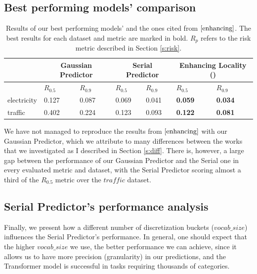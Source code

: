\documentclass[en]{pracamgr}
\begin{document}
	\subsection*{Best performing models' comparison}
	
	\begin{table}[h]
		\begin{center}
			\begin{tabular}
				{ |p{2cm}|p{1.5cm}|p{1.5cm}||p{1.5cm}|p{1.5cm}||p{1.5cm}|p{1.5cm}|  }
				\hline
				& \multicolumn{2}{c||}{Gaussian Predictor} & \multicolumn{2}{|c||}{Serial Predictor} & \multicolumn{2}{|c|}{Enhancing Locality (\cite{enhancing})} \\
				\hline
				& \hfil $R_{0.5}$ & \hfil $R_{0.9}$ & \hfil $R_{0.5}$ & \hfil $R_{0.9}$
				& \hfil $R_{0.5}$ & \hfil $R_{0.9}$
				\\
				\hline
				electricity & \hfil 0.127   & \hfil 0.087    & \hfil 0.069 &   \hfil 0.041 & \hfil \textbf{0.059} & \hfil \textbf{0.034} 
				\\
				traffic &  \hfil 0.402   & \hfil 0.224   & \hfil 0.123 &   \hfil 0.093 & \hfil \textbf{0.122} & \hfil \textbf{0.081}\\
				\hline
			\end{tabular}
			\caption{\label{tab:results}Results of our best performing models' and the ones cited from $\cite{enhancing}$. The best results for each dataset and metric are marked in bold. $R_{p}$ refers to the risk metric described in Section \ref{s:risk}.}
		\end{center}
	\end{table}
	
	We have not managed to reproduce the results from $\cite{enhancing}$ with our Gaussian Predictor, which we attribute to many differences between the works that we investigated as I described in Section \ref{s:diff}. There is, however, a large gap between the performance of our Gaussian Predictor and the Serial one in every evaluated metric and dataset, with the Serial Predictor scoring almost a third of the $R_{0.5}$ metric over the $traffic$ dataset.
	
	\subsection*{Serial Predictor's performance analysis}
	
	
	
	Finally, we present how a different number of discretization buckets ($vocab\_size$) influences the Serial Predictor's performance. In general, one should expect that the higher $vocab\_size$ we use, the better performance we can achieve, since it allows us to have more precision (granularity) in our predictions, and the Transformer model is successful in tasks requiring thousands of categories.
	
\end{document}
